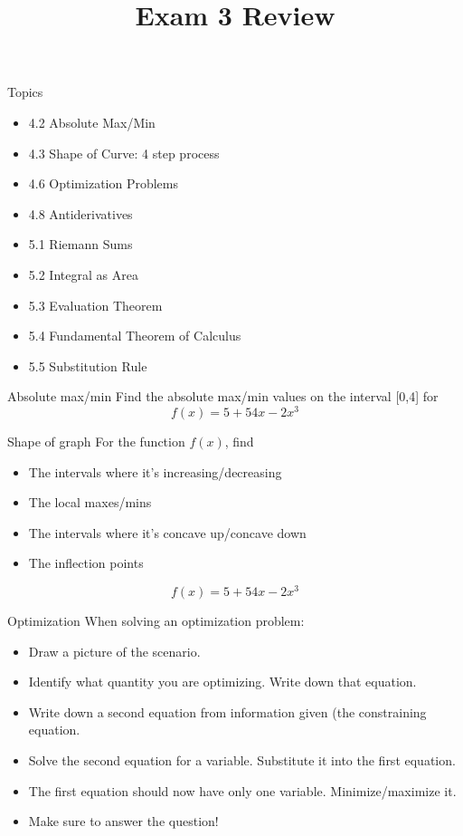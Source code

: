 \documentclass[t]{beamer}
\title{Exam 3 Review}
\date{}
\begin{document}
\frame{\titlepage}

\begin{frame}{Topics}
\begin{itemize}
\item 4.2 Absolute Max/Min
\item 4.3 Shape of Curve: 4 step process
\item 4.6 Optimization Problems
\item 4.8 Antiderivatives
\item 5.1 Riemann Sums
\item 5.2 Integral as Area
\item 5.3 Evaluation Theorem
\item 5.4 Fundamental Theorem of Calculus
\item 5.5 Substitution Rule
\end{itemize}
\end{frame}

\begin{frame}{Absolute max/min}
Find the absolute max/min values on the interval [0,4] for
$$f(x) = 5 + 54x - 2x^3$$
\end{frame}

\begin{frame}{Shape of graph}
For the function $f(x)$, find
\begin{itemize}
\item The intervals where it's increasing/decreasing
\item The local maxes/mins
\item The intervals where it's concave up/concave down
\item The inflection points
\end{itemize}
$$f(x) = 5 + 54x - 2x^3$$
\end{frame}

\begin{frame}{Optimization}
When solving an optimization problem:
\begin{itemize}
\item Draw a picture of the scenario.
\item Identify what quantity you are optimizing. Write down that equation.
\item Write down a second equation from information given
(the constraining equation.
\item Solve the second equation for a variable. Substitute it into the first
equation.
\item The first equation should now have only one variable.
Minimize/maximize it.
\item Make sure to answer the question!
\end{itemize}
\end{frame}
\end{document}
